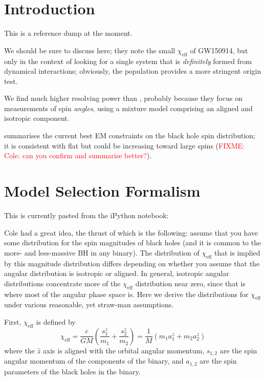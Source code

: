 \documentclass[modern]{aastex61}
\newcommand{\chieff}{\chi_\mathrm{eff}}
\newcommand{\fixme}[1]{\textcolor{red}{FIXME: #1}}
\begin{document}
\acresetall{}

\section{Introduction}

This is a reference dump at the moment.  

We should be sure to discuss \citet{Rodriguez2016} here; they note the
small $\chieff$ of GW150914, but only in the context of looking for a
single system that is \emph{definitely} formed from dynamical
interactions; obviously, the population provides a more stringent
origin test.

We find much higher resolving power than \citet{Vitale2015}, probably
because they focus on measurements of spin \emph{angles}, using a
mixture model comprising an aligned and isotropic component.

\citet{Miller2015} summarises the current best \ac{EM} constraints on
the black hole spin distribution; it is consistent with flat but could
be increasing toward large spins (\fixme{Cole: can you confirm and
  summarise better?}).

\section{Model Selection Formalism}
\label{sec:formalism}

This is currently pasted from the iPython notebook:

Cole had a great idea, the thrust of which is the following: assume
that you have some distribution for the spin magnitudes of black holes
(and it is common to the more- and less-massive BH in any binary).
The distribution of $\chieff$ that is implied by this magnitude
distribution differs depending on whether you assume that the angular
distribution is isotropic or aligned.  In general, isotropic angular
distributions concentrate more of the $\chieff$ distribution near
zero, since that is where most of the angular phase space is.  Here we
derive the distributions for $\chieff$ under various reasonable, yet
straw-man assumptions.

First, $\chieff$ is defined by
\begin{equation}
\chieff = \frac{c}{GM} \left( \frac{s_1^z}{m_1} + \frac{s_2^z}{m_2}
\right) = \frac{1}{M} \left( m_1 a_1^z + m_2 a_2^z \right)
\end{equation}
where the $\hat{z}$ axis is aligned with the orbital angular momentum,
$s_{1,2}$ are the spin angular momentum of the components of the
binary, and $a_{1,2}$ are the spin parameters of the black holes in
the binary.
\end{document}
